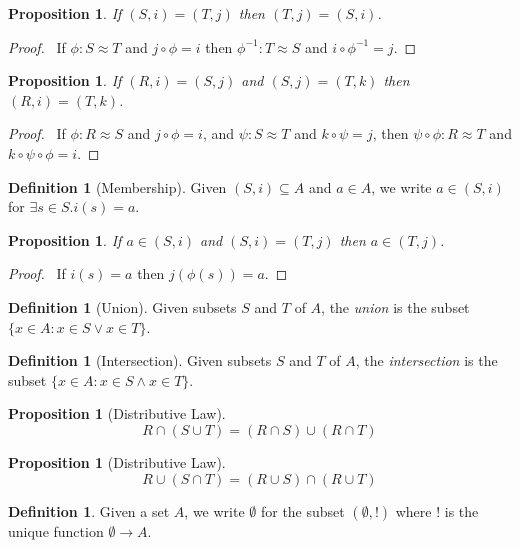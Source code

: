 \documentclass{book}
\let\qed\relax
\newtheorem{prop}[ax]{Proposition}
\theoremstyle{definition}
\newtheorem{df}[ax]{Definition}
\newcommand{\inv}[1]{\ensuremath{{#1}^{-1}}}
\begin{document}
\begin{prop}
If $(S,i) = (T,j)$ then $(T,j) = (S,i)$.
\end{prop}

\begin{proof}
\pf\ If $\phi : S \approx T$ and $j \circ \phi = i$ then $\inv{\phi} : T \approx S$ and $i \circ \inv{\phi} = j$. \qed
\end{proof}

\begin{prop}
If $(R,i) = (S,j)$ and $(S,j) = (T,k)$ then $(R,i) = (T,k)$.
\end{prop}

\begin{proof}
\pf\ If $\phi : R \approx S$ and $j \circ \phi = i$, and $\psi : S \approx T$ and $k \circ \psi = j$, then $\psi \circ \phi : R \approx T$ and $k \circ \psi \circ \phi = i$. \qed
\end{proof}

\begin{df}[Membership]
Given $(S,i) \subseteq A$ and $a \in A$, we write $a \in (S,i)$ for $\exists s \in S. i(s) = a$.
\end{df}

\begin{prop}
If $a \in (S,i)$ and $(S,i) = (T,j)$ then $a \in (T,j)$.
\end{prop}

\begin{proof}
\pf\ If $i(s) = a$ then $j(\phi(s)) = a$. \qed
\end{proof}

\begin{df}[Union]
Given subsets $S$ and $T$ of $A$, the \emph{union} is the subset $\{ x \in A : x \in S \vee x \in T \}$.
\end{df}

\begin{df}[Intersection]
Given subsets $S$ and $T$ of $A$, the \emph{intersection} is the subset $\{ x \in A : x \in S \wedge x \in T \}$.
\end{df}

\begin{prop}[Distributive Law]
\[ R \cap (S \cup T) = (R \cap S) \cup (R \cap T) \]
\end{prop}

\begin{prop}[Distributive Law]
\[ R \cup (S \cap T) = (R \cup S) \cap (R \cup T) \]
\end{prop}

\begin{df}
Given a set $A$, we write $\emptyset$ for the subset $(\emptyset, !)$ where $!$ is the unique function $\emptyset \rightarrow A$.
\end{df}
\end{document}
